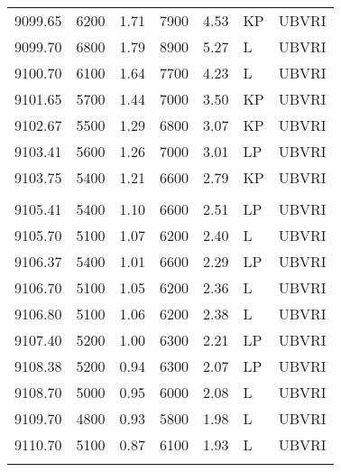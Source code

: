 \begin{center}
\begin{tabular} {l r c r c l l}
 9099.65  &  6200  &  1.71   &     7900  &  4.53 & KP &  UBVRI \\
 9099.70  &  6800  &  1.79   &     8900  &  5.27 & L &  UBVRI \\
 9100.70  &  6100  &  1.64   &     7700  &  4.23 & L &  UBVRI \\
 9101.65  &  5700  &  1.44   &     7000  &  3.50 & KP &  UBVRI \\
 9102.67  &  5500  &  1.29   &     6800  &  3.07 & KP &  UBVRI \\
 9103.41  &  5600  &  1.26   &     7000  &  3.01 & LP  &  UBVRI \\
 9103.75  &  5400  &  1.21   &     6600  &  2.79 & KP &  UBVRI \\
  \\
 9105.41  &  5400  &  1.10   &     6600  &  2.51 & LP  &  UBVRI \\
 9105.70  &  5100  &  1.07   &     6200  &  2.40 & L &  UBVRI \\
 9106.37  &  5400  &  1.01   &     6600  &  2.29 & LP  &  UBVRI \\
 9106.70  &  5100  &  1.05   &     6200  &  2.36 & L &  UBVRI \\
 9106.80  &  5100  &  1.06   &     6200  &  2.38 & L &  UBVRI \\
 9107.40  &  5200  &  1.00   &     6300  &  2.21 & LP  &  UBVRI \\
 9108.38  &  5200  &  0.94   &     6300  &  2.07 & LP  &  UBVRI \\
 9108.70  &  5000  &  0.95   &     6000  &  2.08 & L &  UBVRI \\
 9109.70  &  4800  &  0.93   &     5800  &  1.98 & L &  UBVRI \\
 9110.70  &  5100  &  0.87   &     6100  &  1.93 & L &  UBVRI \\
  \\
\hline
\end{tabular}
\end{center}
\vfill
\eject
 
